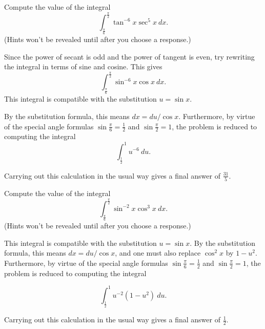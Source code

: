 \documentclass{ximera}
\begin{document}
\begin{question}%

Compute the value of the integral
\[\int_{\frac{\pi}{6}}^{\frac{\pi}{2}} \tan^{-6} x  \sec^{5} x ~dx.\]
(Hints won't be revealed until after you choose a response.)
\begin{multiplechoice}
\end{multiplechoice}
\begin{feedback}
Since the power of secant is odd and the power of tangent is even, try rewriting the integral in terms of sine and cosine. This gives 
\[\int_{\frac{\pi}{6}}^{\frac{\pi}{2}} \sin^{-6} x  \cos x ~dx.\]
This integral is compatible with the substitution \(u = \sin x\). \begin{hint} By the substitution formula, this means \(dx = du / \cos x\). Furthermore, by virtue of the special angle formulas \(\sin \frac{\pi}{6} = \frac{1}{2}\) and \(\sin \frac{\pi}{2} = 1\), the problem is reduced to computing the integral
\[\int_{\frac{1}{2}}^{1} u^{-6} ~du.\] \begin{hint}
Carrying out this calculation in the usual way gives a final answer of \(\frac{31}{5}\). \end{hint} \end{hint}
\end{feedback}

\end{question}

\begin{question}%

Compute the value of the integral
\[\int_{\frac{\pi}{6}}^{\frac{\pi}{2}} \sin^{-2} x  \cos^{3} x ~dx.\]
(Hints won't be revealed until after you choose a response.)
\begin{multiplechoice}
\end{multiplechoice}
\begin{feedback}
This integral is compatible with the substitution \(u = \sin x\). By the substitution formula, this means \(dx = du / \cos x\), and one must also replace \(\cos^2 x\) by \(1-u^2\). Furthermore, by virtue of the special angle formulas \(\sin \frac{\pi}{6} = \frac{1}{2}\) and \(\sin \frac{\pi}{2} = 1\), the problem is reduced to computing the integral \begin{hint}
\[\int_{\frac{1}{2}}^{1} u^{-2}(1-u^2) ~du.\] \begin{hint}
Carrying out this calculation in the usual way gives a final answer of \(\frac{1}{2}\). \end{hint} \end{hint}
\end{feedback}

\end{question}
\end{document}
